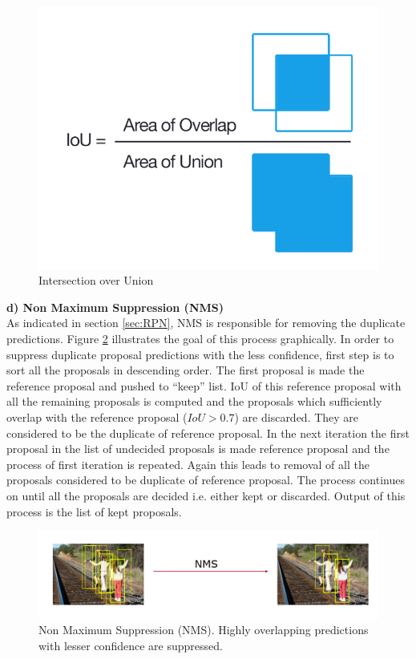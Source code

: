 \begin{figure}
    \centering
    \includegraphics[width=0.5\linewidth]{images/iou.PNG}
    \caption{Intersection over Union}
    \label{fig:iou}
\end{figure}


\textbf{d) Non Maximum Suppression (NMS)} \\
As indicated in section \ref{sec:RPN}, NMS is responsible for removing the duplicate predictions. Figure \ref{fig:nms} illustrates the goal of this process graphically. In order to suppress duplicate proposal predictions with the less confidence, first step is to sort all the proposals in descending order. The first proposal is made  the reference proposal and pushed to ``keep'' list. IoU of this reference proposal with all the remaining proposals is computed and the proposals which sufficiently overlap with the reference proposal ($IoU > 0.7$) are discarded. They are considered to be the duplicate of reference proposal. In the next iteration the first proposal in the list of undecided proposals is made reference proposal and the process of first iteration is repeated. Again this leads to removal of all the proposals considered to be duplicate of reference proposal. The process continues on until all the proposals are decided i.e. either kept or discarded. Output of this process is the list of kept proposals. 


\begin{figure}
    \centering
    \includegraphics[width=\linewidth]{images/nms.PNG}
    \caption[Non Maximum Suppression (NMS)]{Non Maximum Suppression (NMS). Highly overlapping predictions with lesser confidence are suppressed.}
    \label{fig:nms}
\end{figure}

